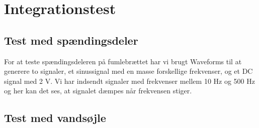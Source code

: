 \section{Integrationstest}
\subsection{Test med spændingsdeler}
For at teste spændingsdeleren på fumlebrættet har vi brugt Waveforms til at generere to signaler, et sinussignal med en masse forskellige
frekvenser, og et DC signal med 2 V.  Vi har indsendt signaler med frekvenser mellem 10 Hz og 500 Hz og her kan det ses, at signalet dæmpes når frekvensen stiger. 



\subsection{Test med vandsøjle}

